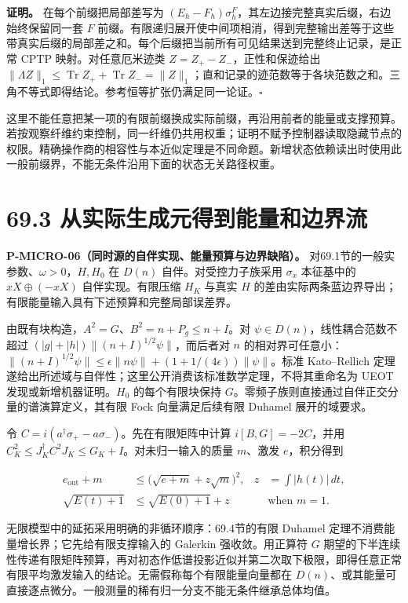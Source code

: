 \documentclass[
  11pt,
  oneside]{book}
\begin{document}
\textbf{证明。} 在每个前缀把局部差写为
\((E_h-F_h)\sigma_h^F\)，其左边接完整真实后缀，右边始终保留同一套 \(F\)
前缀。有限递归展开使中间项相消，得到完整输出差等于这些带真实后缀的局部差之和。每个后缀把当前所有可见结果送到完整终止记录，是正常
CPTP 映射。对任意厄米迹类 \(Z=Z_+-Z_-\)，正性和保迹给出
\(\|\Lambda Z\|_1\le\operatorname{Tr}Z_++\operatorname{Tr}Z_-=\|Z\|_1\)；直和记录的迹范数等于各块范数之和。三角不等式即得结论。参考恒等扩张仍满足同一论证。\(\square\)

这里不能任意把某一项的有限前缀换成实际前缀，再沿用前者的能量或支撑预算。若按观察纤维约束控制，同一纤维仍共用权重；证明不赋予控制器读取隐藏节点的权限。精确操作商的相容性与本近似定理是不同命题。新增状态依赖读出时使用此一般前缀界，不能无条件沿用下面的状态无关路径权重。

\section{69.3 从实际生成元得到能量和边界流}

\protect\hypertarget{p-micro-06}{}{}

\textbf{P-MICRO-06（同时源的自伴实现、能量预算与边界缺陷）。}
对69.1节的一般实参数、\(\omega>0\)，\(H,H_0\) 在 \(D(n)\)
自伴。对受控力子族采用 \(\sigma_x\) 本征基中的 \(xX\oplus(-xX)\)
自伴实现。有限压缩 \(H_K\) 与真实 \(H\)
的差由实际两条蓝边界导出；有限能量输入具有下述预算和完整局部误差界。

由既有块构造，\(A^2=G\)、\(B^2=n+P_g\le n+I\)。对
\(\psi\in D(n)\)，线性耦合范数不超过
\((|g|+|h|)\|(n+I)^{1/2}\psi\|\)，而后者对 \(n\)
的相对界可任意小：\(\|(n+I)^{1/2}\psi\|\le\epsilon\|n\psi\|+(1+1/(4\epsilon))\|\psi\|\)。标准
Kato--Rellich
定理遂给出所述域与自伴性；这里公开消费该标准数学定理，不将其重命名为
UEOT 发现或新增机器证明。\(H_0\) 的每个有限块保持
\(G\)。零频子族则直接通过自伴正交分量的谱演算定义，其有限 Fock
向量满足后续有限 Duhamel 展开的域要求。

令 \(C=i(a^\dagger\sigma_+-a\sigma_-)\)。先在有限矩阵中计算
\(i[B,G]=-2C\)，并用
\(C_K^2\le J_K^\dagger C^2J_K\le G_K+I\)。对未归一输入的质量 \(m\)、激发
\(e\)，积分得到

\[
\begin{aligned}
e_{\mathrm{out}}+m
&\le\bigl(\sqrt{e+m}+z\sqrt m\bigr)^2,
&z&=\int|h(t)|\,dt,\\
\sqrt{E(t)+1}&\le\sqrt{E(0)+1}+z
&&\text{when }m=1.
\end{aligned}
\]

无限模型中的延拓采用明确的非循环顺序：69.4节的有限 Duhamel
定理不消费能量增长界；它先给有限支撑输入的 Galerkin 强收敛。用正算符
\(G\)
期望的下半连续性传递有限矩阵预算，再对初态作低谱投影近似并第二次取下极限，即得任意正常有限平均激发输入的结论。无需假称每个有限能量向量都在
\(D(n)\)、或其能量可直接逐点微分。一般测量的稀有归一分支不能无条件继承总体均值。
\end{document}
